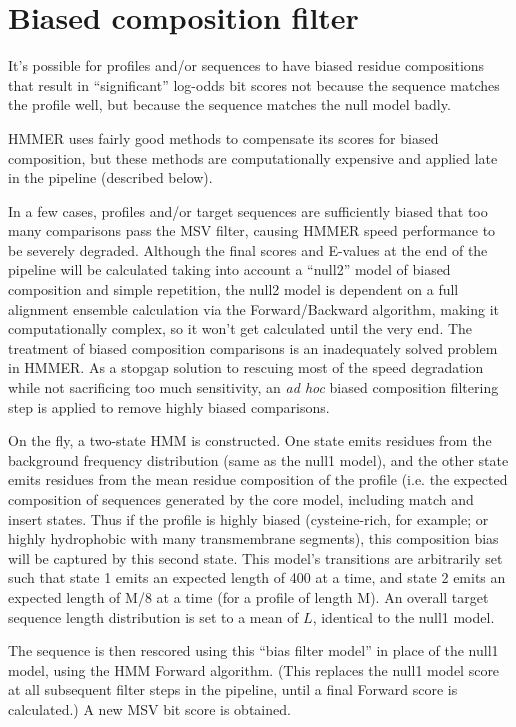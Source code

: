 \section{Biased composition filter}

It's possible for profiles and/or sequences to have biased residue
compositions that result in ``significant'' log-odds bit scores not
because the sequence matches the profile well, but because the
sequence matches the null model badly.

HMMER uses fairly good methods to compensate its scores for biased
composition, but these methods are computationally expensive and
applied late in the pipeline (described below).

In a few cases, profiles and/or target sequences are sufficiently
biased that too many comparisons pass the MSV filter, causing HMMER
speed performance to be severely degraded. Although the final scores
and E-values at the end of the pipeline will be calculated taking into
account a ``null2'' model of biased composition and simple repetition,
the null2 model is dependent on a full alignment ensemble calculation
via the Forward/Backward algorithm, making it computationally complex,
so it won't get calculated until the very end. The treatment of biased
composition comparisons is an inadequately solved problem in HMMER. As
a stopgap solution to rescuing most of the speed degradation while not
sacrificing too much sensitivity, an \emph{ad hoc} biased composition
filtering step is applied to remove highly biased comparisons.

On the fly, a two-state HMM is constructed. One state emits residues
from the background frequency distribution (same as the null1 model),
and the other state emits residues from the mean residue composition
of the profile (i.e. the expected composition of sequences generated
by the core model, including match and insert
states. Thus if
the profile is highly biased (cysteine-rich, for example; or highly
hydrophobic with many transmembrane segments), this composition bias
will be captured by this second state. This model's transitions are
arbitrarily set such that state 1 emits an expected length of 400 at a
time, and state 2 emits an expected length of M/8 at a time (for a
profile of length M). An overall target sequence length distribution
is set to a mean of $L$, identical to the null1 model.

The sequence is then rescored using this ``bias filter model'' in
place of the null1 model, using the HMM Forward algorithm. (This
replaces the null1 model score at all subsequent filter steps in the
pipeline, until a final Forward score is calculated.) A new MSV bit
score is obtained.


